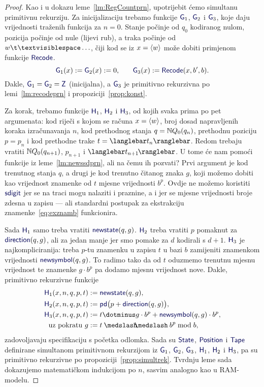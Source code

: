 \begin{proof}
	Kao i u dokazu leme~\ref{lm:RegCountprn}, upotrijebit ćemo simultanu primitivnu rekurziju. Za inicijalizaciju trebamo funkcije $\f G_1$, $\f G_2$ i $\f G_3$, koje daju vrijednosti traženih funkcija za $n=0$. Stanje počinje od $q_0$ kodiranog nulom, pozicija počinje od nule (lijevi rub), a traka počinje od $w\bl\ldots$, čiji kod se iz $x=\langle w\rangle$ može dobiti primjenom funkcije $\f{Recode}$.
\begin{equation}
    \f G_1(x):=\f G_2(x):=0\text,\qquad
    \f G_3(x):=\f{Recode}(x,b',b)\text.
\end{equation}
Dakle, $\f G_1=\f G_2=\f Z$ (inicijalna), a $\f G_3$ je primitivno rekurzivna po lemi~\ref{lm:recodeprn} i propoziciji~\ref{prop:konst}.

	Za korak, trebamo funkcije $\f H_1$, $\f H_2$ i $\f H_3$, od kojih svaka prima po pet argumenata: kod riječi s kojom se računa $x=\langle w\rangle$, broj dosad napravljenih koraka izračunavanja $n$, kod prethodnog stanja $q={\mathbb N} Q_0(q_n)$, prethodnu poziciju $p=p_n$ i kod prethodne trake $t=\knk{t_n}$. Redom trebaju vratiti ${\mathbb N} Q_0(q_{n+1})$, $p_{n+1}$ i $\knk{t_{n+1}\mspace{-2mu}}$. U tome će nam pomoći funkcije iz leme~\ref{lm:newssdprn}, ali na čemu ih pozvati? Prvi argument je kod trenutnog stanja $q$, a drugi je kod trenutno čitanog znaka $g$, koji možemo dobiti kao vrijednost znamenke od $t$ mjesne vrijednosti $b^p$. Ovdje ne možemo koristiti $\f{sdigit}$ jer se na traci mogu nalaziti i praznine, a i jer se mjesne vrijednosti broje zdesna u zapisu --- ali standardni postupak za ekstrakciju znamenke~\eqref{eq:exznamb} funkcionira.

Sada $\f H_1$ samo treba vratiti $\f{newstate}(q,g)$. $\f H_2$ treba vratiti $p$ pomaknut za $\f{direction}(q,g)$, ali za jedan manje jer smo pomake za $d$ kodirali s $d+1$. $\f H_3$ je najkompliciranija: treba $p$-tu znamenku u zapisu $t$ u bazi $b$ zamijeniti znamenkom vrijednosti $\f{newsymbol}(q,g)$. To radimo tako da od $t$ oduzmemo trenutnu mjesnu vrijednost te znamenke $g\cdot b^p$ pa dodamo mjesnu vrijednost nove. Dakle, primitivno rekurzivne funkcije
\begin{align}
    \f H_1(x,n,q,p,t)&:=\f{newstate}(q,g)\text,\\
    \f H_2(x,n,q,p,t)&:=\f{pd}\bigl(p+\f{direction}(q,g)\bigr)\text,\\
    \f H_3(x,n,q,p,t)&:=t\dotminus g\cdot b^p+\f{newsymbol}(q,g)\cdot b^p\text,\\
    \label{eq:exznamb}\text{uz pokratu }g&:=t\div b^p\bmod b\text,
\end{align}
zadovoljavaju specifikaciju s početka odlomka. Sada su $\f{State}$, $\f{Position}$ i $\f{Tape}$ definirane simultanom primitivnom rekurzijom iz $\f G_1$, $\f G_2$, $\f G_3$, $\f H_1$, $\f H_2$ i $\f H_3$, pa su primitivno rekurzivne po propoziciji~\ref{prop:simultrek}. Tvrdnju leme sada dokazujemo matematičkom indukcijom po $n$, sasvim analogno kao u RAM-modelu.


\end{proof}
